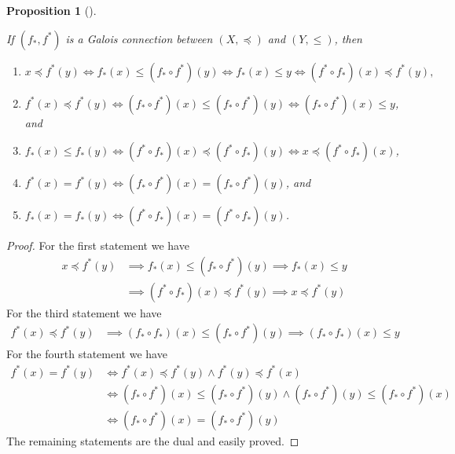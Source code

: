 \documentclass[
  twoside,
  12pt,
  letterpaper,
  fleqn]{article}
\providecommand{\tightlist}{%
  \setlength{\itemsep}{0pt}\setlength{\parskip}{0pt}}\usepackage{longtable,booktabs,array}
\theoremstyle{definition}
\theoremstyle{definition}
\theoremstyle{plain}
\newtheorem{proposition}{Proposition}[section]
\theoremstyle{remark}
\begin{document}
\begin{proposition}[]\protect\hypertarget{prp-galois-connection-property}{}\label{prp-galois-connection-property}

If \((f_*, f^*)\) is a Galois connection between \((X,\preceq)\) and
\((Y,\leqslant)\), then

\begin{enumerate}
\def\labelenumi{\arabic{enumi}.}
\tightlist
\item
  \(x \preceq f^*(y) \Longleftrightarrow f_*(x)\leqslant (f_*\circ f^*)(y) \Longleftrightarrow f_*(x)\leqslant y \Longleftrightarrow (f^*\circ f_*)(x)\preceq f^*(y),\)
\item
  \(f^*(x)\preceq f^*(y)\Longleftrightarrow (f_*\circ f^*)(x)\leqslant (f_*\circ f^*)(y) \Longleftrightarrow (f_*\circ f^*)(x)\leqslant y\),
  and
\item
  \(f_*(x)\leqslant f_*(y) \Longleftrightarrow (f^*\circ f_*)(x)\preceq (f^*\circ f_*)(y) \Longleftrightarrow x\preceq (f^*\circ f_*)(x)\),
\item
  \(f^*(x)=f^*(y) \Longleftrightarrow (f_*\circ f^*)(x)=(f_*\circ f^*)(y)\),
  and
\item
  \(f_*(x)=f_*(y) \Longleftrightarrow (f^*\circ f_*)(x)=(f^*\circ f_*)(y)\).
\end{enumerate}

\end{proposition}

\begin{proof}

For the first statement we have \begin{align*}
x \preceq f^*(y) 
& \implies f_*(x)\leqslant (f_*\circ f^*)(y) 
\implies f_*(x)\leqslant y \\
& \implies (f^*\circ f_*)(x) \preceq f^*(y) 
\implies x\preceq f^*(y)  
\end{align*} For the third statement we have \begin{align*}
f^*(x) \preceq f^*(y) 
& \implies (f_*\circ f_*)(x)\leqslant (f_*\circ f^*)(y) 
 \implies (f_*\circ f_*)(x)\leqslant y 
\end{align*} For the fourth statement we have \begin{align*}
f^*(x)=f^*(y) 
& \Longleftrightarrow f^*(x)\preceq f^*(y) \land f^*(y) \preceq f^*(x) \\
& \Longleftrightarrow (f_*\circ f^*)(x)\leqslant (f_*\circ f^*)(y) \land  (f_*\circ f^*)(y)\leqslant (f_*\circ f^*)(x) \\
& \Longleftrightarrow (f_*\circ f^*)(x)=(f_*\circ f^*)(y) 
\end{align*} The remaining statements are the dual and easily proved.

\end{proof}
\end{document}
